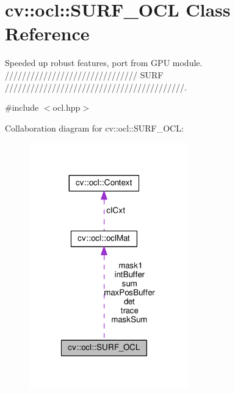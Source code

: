 \hypertarget{classcv_1_1ocl_1_1SURF__OCL}{\section{cv\-:\-:ocl\-:\-:S\-U\-R\-F\-\_\-\-O\-C\-L Class Reference}
\label{classcv_1_1ocl_1_1SURF__OCL}
}


Speeded up robust features, port from G\-P\-U module. /////////////////////////////// S\-U\-R\-F //////////////////////////////////////////.  




{\ttfamily \#include $<$ocl.\-hpp$>$}



Collaboration diagram for cv\-:\-:ocl\-:\-:S\-U\-R\-F\-\_\-\-O\-C\-L\-:\nopagebreak
\begin{figure}[H]
\begin{center}
\leavevmode
\includegraphics[width=195pt]{classcv_1_1ocl_1_1SURF__OCL__coll__graph}
\end{center}
\end{figure}
